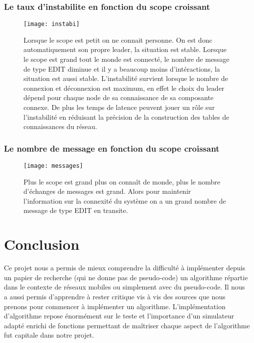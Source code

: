 \documentclass[11pt,a4paper,sans]{report}
\begin{document}
	\subsection{Le taux d'instabilite en fonction du scope croissant}
	\begin{figure}[H]
		\centering
		\texttt{[image: instabi]}
		\caption{ Lorsque le scope est petit on ne connait personne. On est donc automatiquement son propre leader, la situation est stable. Lorsque le scope est grand tout le monde est connecté, le nombre de message de type EDIT diminue et il y a beaucoup moins d'intéractions, la situation est aussi stable. L'instabilité survient lorsque le nombre de connexion et déconnexion est maximum, en effet le choix du leader dépend pour chaque node de sa connaissance de sa composante connexe. De plus les temps de latence peuvent jouer un rôle sur l'instabilité en réduisant la précision de la construction des tables de connaissances du réseau.
		}
	\end{figure}


	\subsection{Le nombre de message en fonction du scope croissant}
	\begin{figure}[H]
		\centering
		\texttt{[image: messages]}
		\caption{Plus le scope est grand plus on connaît de monde, plus le nombre d'échanges de messages est grand. Alors pour maintenir l'information sur la connexité du système on a un grand nombre de message de type EDIT en transite. 
		}
	\end{figure}
	
	\newpage
	\chapter{Conclusion}
	Ce projet nous a permis de mieux comprendre la difficulté à implémenter depuis un papier de recherche (qui ne donne pas de pseudo-code) un algorithme répartie dans le contexte de réseaux mobiles ou simplement avec du pseudo-code. Il nous a aussi permis d'apprendre à rester critique vis à vis des sources que nous prenons pour commencer à implémenter un algorithme. 
	L'implémentation d'algorithme repose énormément sur le teste et l'importance d'un simulateur adapté enrichi de fonctions permettant de maîtriser chaque aspect de l'algorithme fut capitale dans notre projet.  
\end{document}
